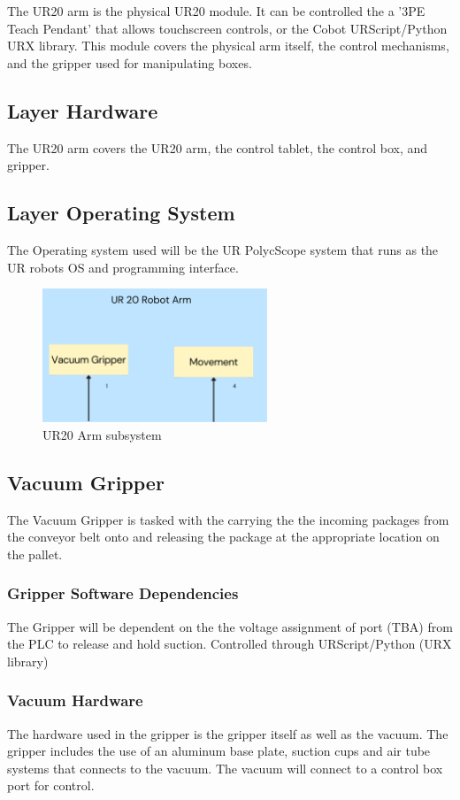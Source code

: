 The UR20 arm is the physical UR20 module. It can be controlled the a '3PE Teach Pendant' that allows touchscreen controls, or the Cobot URScript/Python URX library. This module covers the physical arm itself, the control mechanisms, and the gripper used for manipulating boxes.

\subsection{Layer Hardware}
The UR20 arm covers the UR20 arm, the control tablet, the control box, and gripper.

\subsection{Layer Operating System}
The Operating system used will be the UR PolycScope system that runs as the UR robots OS and programming interface.

\begin{figure}[h!]
	\centering
 	\includegraphics[width=0.60\textwidth]{images/arm}
 \caption{UR20 Arm subsystem}
\end{figure}

\subsection{Vacuum Gripper}
The Vacuum Gripper is tasked with the carrying the the incoming packages from the conveyor belt onto and releasing the package at the appropriate location on the pallet.

\subsubsection{Gripper Software Dependencies}
The Gripper will be dependent on the the voltage assignment of port (TBA) from the PLC to release and hold suction. Controlled through URScript/Python (URX library)

\subsubsection{Vacuum Hardware}
The hardware used in the gripper is the gripper itself as well as the vacuum. The gripper includes the use of an aluminum base plate, suction cups and air tube systems that connects to the vacuum. The vacuum will connect to a control box port for control.

